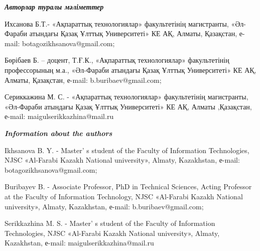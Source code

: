 \begin{authorinfo}
\emph{{\bfseries Авторлар туралы мәліметтер}}

Ихсанова Б.Т.- «Ақпараттық технологиялар» факультетінің магистранты,
«Әл-Фараби атындағы Қазақ Ұлттық Университеті» КЕ АҚ, Алматы, Қазақстан,
е-mail: botagozikhsanova@gmail.com;

Бөрібаев Б. -- доцент, Т.Ғ.К., «Ақпараттық технологиялар» факультетінің
профессорының м.а., «Әл-Фараби атындағы Қазақ Ұлттық Университеті» КЕ
АҚ, Алматы, Қазақстан, е-mail: b.buribaev@gmail.com;

Сериккажина М. С. - «Ақпараттық технологиялар» факультетінің
магистранты, «Әл-Фараби атындағы Қазақ Ұлттық Университеті» КЕ АҚ,
Алматы ,Қазақстан, е-mail: maigulserikkazhina@mail.ru

\emph{{\bfseries Information about the authors}}

Ikhsanova B. Y. - Master' s student of the Faculty of
Information Technologies, NJSC «Al-Farabi Kazakh National university»,
Almaty, Kazakhstan, е-mail: botagozikhsanova@gmail.com;

Buribayev B. - Associate Professor, PhD in Technical Sciences, Acting
Professor at the Faculty of Information Technology, NJSC «Al-Farabi
Kazakh National university», Almaty, Kazakhstan, е-mail:
b.buribaev@gmail.com;

Serikkazhina M. S. - Master' s student of the Faculty of
Information Technologies, NJSC «Al-Farabi Kazakh National
university», Almaty, Kazakhstan, е-mail: maigulserikkazhina@mail.ru\
\end{authorinfo}
